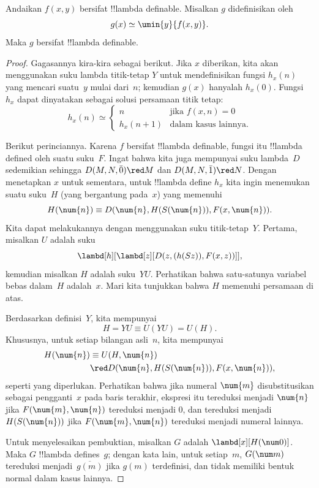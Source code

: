 \documentclass[../../../include/open-logic-section]{subfiles}
\begin{document}

\begin{lem}
Andaikan $f(x,y)$ bersifat !!{lambda definable}. Misalkan $g$ didefinisikan
oleh
\[
g(x) \simeq \umin{y}{f(x,y)}.
\]
Maka $g$ bersifat !!{lambda definable}.
\end{lem}

\begin{proof}
Gagasannya kira-kira sebagai berikut. Jika $x$ diberikan, kita akan
menggunakan suku lambda titik-tetap $Y$ untuk mendefinisikan fungsi $h_x(n)$
yang mencari suatu~$y$ mulai dari~$n$; kemudian $g(x)$ hanyalah $h_x(0)$.
Fungsi~$h_x$ dapat dinyatakan sebagai solusi persamaan titik tetap:
\[
h_x(n) \simeq
\begin{cases}
n & \text{jika $f(x,n) = 0$} \\
h_x(n+1) & \text{dalam kasus lainnya.}
\end{cases}
\]

Berikut perinciannya. Karena $f$ bersifat !!{lambda definable}, fungsi itu
!!{lambda defined} oleh suatu suku~$F$. Ingat bahwa kita juga mempunyai suku
lambda~$D$ sedemikian sehingga $D(M,N,\bar{0}) \red M$ dan
$D(M,N,\bar{1}) \red N$. Dengan menetapkan $x$ untuk sementara, untuk
!!{lambda define} $h_x$ kita ingin menemukan suatu suku~$H$ (yang bergantung
pada~$x$) yang memenuhi
\[
H(\num{n}) \equiv D(\num{n}, H(S(\num{n})), F(x, \num{n})).
\]
Kita dapat melakukannya dengan menggunakan suku titik-tetap~$Y$. Pertama,
misalkan $U$ adalah suku
\[
\lambd[h][\lambd[z][D(z,(h(Sz)),F(x,z))]],
\]
kemudian misalkan $H$ adalah suku~$YU$. Perhatikan bahwa satu-satunya variabel
bebas dalam~$H$ adalah~$x$. Mari kita tunjukkan bahwa $H$ memenuhi persamaan
di atas.

Berdasarkan definisi~$Y$, kita mempunyai
\[
H = YU \equiv U(YU) = U(H).
\]
Khususnya, untuk setiap bilangan asli~$n$, kita mempunyai
\begin{align*}
H(\num{n}) & \equiv U(H, \num{n}) \\
& \red D(\num{n}, H(S(\num{n})), F(x, \num{n})),
\end{align*}
seperti yang diperlukan. Perhatikan bahwa jika numeral $\num{m}$
disubstitusikan sebagai pengganti~$x$ pada baris terakhir, ekspresi itu
tereduksi menjadi $\num{n}$ jika $F(\num{m},\num{n})$ tereduksi menjadi
$\num{0}$, dan tereduksi menjadi $H(S(\num{n}))$ jika
$F(\num{m},\num{n})$ tereduksi menjadi numeral lainnya.

Untuk menyelesaikan pembuktian, misalkan $G$ adalah
$\lambd[x][H(\num 0)]$. Maka $G$ !!{lambda define}s~$g$; dengan kata lain,
untuk setiap~$m$, $G(\num m)$ tereduksi menjadi~$\overline{g(m)}$ jika $g(m)$
terdefinisi, dan tidak memiliki bentuk normal dalam kasus lainnya.
\end{proof}
\end{document}
